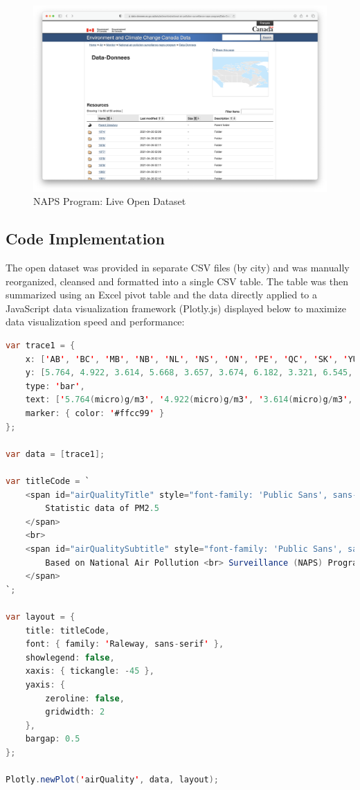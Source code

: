 \documentclass[12pt, letterpaper]{article}
\begin{document}
\begin{figure}[htbp]
	\centering
	\includegraphics[width=\textwidth]{images/21-1-opendataset.png}
	\caption{NAPS Program: Live Open Dataset}
 \end{figure}

\newpage

\subsection*{Code Implementation}
The open dataset was provided in separate CSV files (by city) and was manually reorganized, cleansed and formatted into a single CSV table. The table was then summarized using an Excel pivot table and the data directly applied to a JavaScript data visualization framework (Plotly.js) displayed below to maximize data visualization speed and performance:

\begin{lstlisting}[language=java]
var trace1 = {
	x: ['AB', 'BC', 'MB', 'NB', 'NL', 'NS', 'ON', 'PE', 'QC', 'SK', 'YU'],
	y: [5.764, 4.922, 3.614, 5.668, 3.657, 3.674, 6.182, 3.321, 6.545, 4.722, 2.588],
	type: 'bar',
	text: ['5.764(micro)g/m3', '4.922(micro)g/m3', '3.614(micro)g/m3', '5.668(micro)g/m3', '3.657(micro)g/m3', '3.674(micro)g/m3', '6.182(micro)g/m3', '3.321(micro)g/m3', '6.545(micro)g/m3', '4.722(micro)g/m3', '2.588(micro)g/m3'],
	marker: { color: '#ffcc99' }
};

var data = [trace1];

var titleCode = `
	<span id="airQualityTitle" style="font-family: 'Public Sans', sans-serif; font-size: 1.618rem; font-weight: bold;">
		Statistic data of PM2.5 
	</span>
	<br>
	<span id="airQualitySubtitle" style="font-family: 'Public Sans', sans-serif; font-size: 1rem;">
		Based on National Air Pollution <br> Surveillance (NAPS) Program
	</span>
`;

var layout = {
	title: titleCode,
	font: { family: 'Raleway, sans-serif' },
	showlegend: false,
	xaxis: { tickangle: -45 },
	yaxis: {
		zeroline: false,
		gridwidth: 2
	},
	bargap: 0.5
};

Plotly.newPlot('airQuality', data, layout);
\end{lstlisting}
\end{document}
